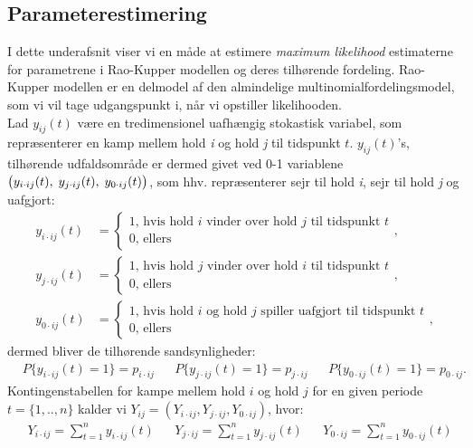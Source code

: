 \documentclass[11pt,a4paper]{article}
\begin{document}
\subsection{Parameterestimering}
I dette underafsnit viser vi en måde at estimere \textit{maximum likelihood} estimaterne for parametrene i Rao-Kupper modellen og deres tilhørende fordeling.
Rao-Kupper modellen er en delmodel af den almindelige multinomialfordelingsmodel, som vi vil tage udgangspunkt i, når vi opstiller likelihooden.\\
Lad $y_{ij}(t)$ være en tredimensionel uafhængig stokastisk variabel, som repræsenterer en kamp mellem hold \textit{i} og hold \textit{j} til tidspunkt $t$. $y_{ij}(t)$'s, tilhørende udfaldsområde er dermed givet ved 0-1 variablene $\big{(}y_{i\cdot ij}(t),\;y_{j\cdot ij}(t),\;y_{0\cdot ij}(t)\big{)}$, som hhv. repræsenterer sejr til hold \textit{i}, sejr til hold \textit{j} og uafgjort: 
\begin{align*}
  y_{i\cdot ij}(t)&=\begin{cases}
1\text{, hvis hold $i$ vinder over hold $j$ til tidspunkt $t$}\\
0\text{, ellers}
\end{cases},\\
 y_{j\cdot ij}(t)&=\begin{cases}
1\text{, hvis hold $j$ vinder over hold $i$ til tidspunkt $t$}\\
0\text{, ellers}
\end{cases},\\
 y_{0\cdot ij}(t)&=\begin{cases}
1\text{, hvis hold $i$ og hold $j$ spiller uafgjort til tidspunkt $t$}\\
0\text{, ellers}
\end{cases},
\end{align*}
dermed bliver de tilhørende sandsynligheder:
\begin{align*}
   &P\{y_{i\cdot ij}(t)=1\}=p_{i\cdot ij} &&P\{y_{j\cdot ij}(t)=1\}=p_{j\cdot ij} &&P\{y_{0\cdot ij}(t)=1\}=p_{0\cdot ij}.
\end{align*}
 Kontingenstabellen for kampe mellem hold $i$ og hold $j$ for en given periode $t=\{1,..,n\}$ kalder vi $Y_{ij}=(Y_{i\cdot ij},Y_{j\cdot ij},Y_{0\cdot ij})$, hvor:
\begin{align*}
    &Y_{i\cdot ij}=\sum_{t=1}^{n}y_{i\cdot ij}(t) &&Y_{j\cdot ij}=\sum_{t=1}^ny_{j\cdot ij}(t) &&Y_{0\cdot ij}=\sum_{t=1}^ny_{0\cdot ij}(t)
\end{align*}
\\
\end{document}
